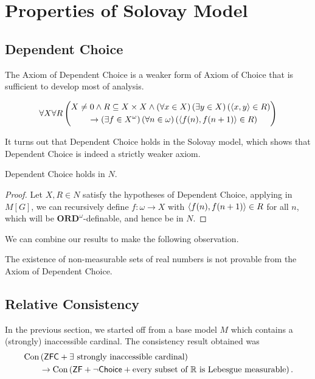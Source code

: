 \section{Properties of Solovay Model}

\subsection{Dependent Choice}

The Axiom of Dependent Choice is a weaker form of Axiom of Choice that is sufficient to develop most of analysis.

\begin{axiom}
    \[
        \forall X\forall R\left(
            \begin{split}
                &X\ne0 \land R\subseteq X\times X \land \left(\forall x\in X\right)\left(\exists y\in X\right)\left(\left\langle x,y\right\rangle\in R\right) \\
                &\qquad \rightarrow \left(\exists f\in X^\omega\right)\left(\forall n\in\omega\right)\left(\left\langle f(n),f(n+1)\right\rangle\in R\right)
            \end{split}
        \right)
    \]
\end{axiom}
It turns out that Dependent Choice holds in the Solovay model, which shows that Dependent Choice is indeed a strictly weaker axiom.
\begin{lemma}
    Dependent Choice holds in \(N\).
\end{lemma}
\begin{proof}
    Let \(X,R\in N\) satisfy the hypotheses of Dependent Choice,
    applying  in \(M[G]\),
    we can recursively define \(f:\omega\to X\) with \(\left\langle f(n),f(n+1)\right\rangle\in R\) for all \(n\),
    which will be \(\mathbf{ORD}^\omega\)-definable, and hence be in \(N\).
\end{proof}

We can combine our results to make the following observation.
\begin{observation}
    The existence of non-measurable sets of real numbers is not provable from the Axiom of Dependent Choice.
\end{observation}

\subsection{Relative Consistency}

In the previous section, we started off from a base model \(M\) which contains a (strongly) inaccessible cardinal.
The consistency result obtained was
\[
    \begin{split}
        &\operatorname{Con}\left(\mbox{\normalfont \textsf{ZFC}} + \exists \text{ strongly inaccessible cardinal}\right) \\
        &\qquad \rightarrow \operatorname{Con}\left(\mbox{\normalfont \textsf{ZF}} + \lnot{\normalfont\textsf{Choice}} + \text{every subset of $\mathbb{R}$ is Lebesgue measurable}\right).
    \end{split}
\]

